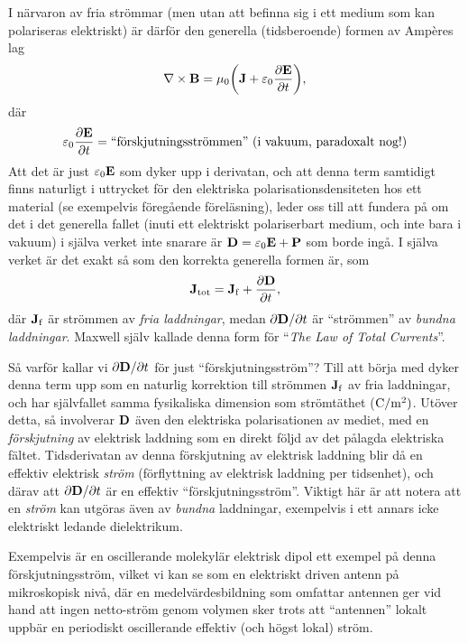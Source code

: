 I n{\"a}rvaron av fria str{\"o}mmar (men utan att befinna sig i ett medium som
kan polariseras elektriskt) {\"a}r d{\"a}rf{\"o}r den generella (tidsberoende)
formen av Amp\`eres lag
$$
  \nabla\times{\bf B}=\mu_0\bigg({\bf J}
    +\varepsilon_0{{\partial{\bf E}}\over{\partial t}}\bigg),
$$
d{\"a}r
$$
  \varepsilon_0{{\partial{\bf E}}\over{\partial t}}
    =\hbox{``f{\"o}rskjutningsstr{\"o}mmen'' (i vakuum, paradoxalt nog!)}
$$
Att det {\"a}r just $\varepsilon_0{\bf E}$ som dyker upp i derivatan, och att
denna term samtidigt finns naturligt i uttrycket f{\"o}r den elektriska
polarisationsdensiteten hos ett material (se exempelvis f{\"o}reg{\aa}ende
f{\"o}rel{\"a}sning), leder oss till att fundera p{\aa} om det i det generella
fallet (inuti ett elektriskt polariserbart medium, och inte bara i vakuum)
i sj{\"a}lva verket inte snarare {\"a}r ${\bf D}=\varepsilon_0{\bf E}+{\bf P}$
som borde ing{\aa}. I sj{\"a}lva verket {\"a}r det exakt s{\aa} som den
korrekta generella formen {\"a}r, som
$$
  {\bf J}_{\rm tot} = {\bf J}_{\rm f}+{{\partial{\bf D}}\over{\partial t}},
$$
d{\"a}r ${\bf J}_{\rm f}$ {\"a}r str{\"o}mmen av {\it fria laddningar}, medan
${{\partial{\bf D}}/{\partial t}}$ {\"a}r ``str{\"o}mmen'' av {\it bundna
laddningar}. Maxwell sj{\"a}lv kallade denna form f{\"o}r ``{\it The Law of
Total Currents}''.

S{\aa} varf{\"o}r kallar vi ${{\partial{\bf D}}/{\partial t}}$ f{\"o}r just
``f{\"o}rskjutningsstr{\"o}m''? Till att b{\"o}rja med dyker denna term upp
som en naturlig korrektion till str{\"o}mmen ${\bf J}_{\rm f}$ av fria
laddningar, och har sj{\"a}lvfallet samma fysikaliska dimension som
str{\"o}mt{\"a}thet (${\rm C}/{\rm m}^2)$. Ut{\"o}ver detta, s{\aa} involverar
${\bf D}$ {\"a}ven den elektriska polarisationen av mediet, med en
{\it f{\"o}rskjutning} av elektrisk laddning som en direkt f{\"o}ljd av det
p{\aa}lagda elektriska f{\"a}ltet. Tidsderivatan av denna f{\"o}rskjutning av
elektrisk laddning blir d{\aa} en effektiv elektrisk {\it str{\"o}m}
(f{\"o}rflyttning av elektrisk laddning per tidsenhet), och d{\"a}rav att
${{\partial{\bf D}}/{\partial t}}$ {\"a}r en effektiv
``f{\"o}rskjutningsstr{\"o}m''. Viktigt h{\"a}r {\"a}r att notera att en
{\it str{\"o}m} kan utg{\"o}ras {\"a}ven av {\it bundna} laddningar,
exempelvis i ett annars icke elektriskt ledande dielektrikum.
\smallskip
\centerline{}
\medskip
\noindent
Exempelvis {\"a}r en oscillerande molekyl{\"a}r elektrisk dipol ett exempel
p{\aa} denna f{\"o}rskjutningsstr{\"o}m, vilket vi kan se som en elektriskt
driven antenn p{\aa} mikroskopisk niv{\aa}, d{\"a}r en medelv{\"a}rdesbildning
som omfattar antennen ger vid hand att ingen netto-str{\"o}m genom volymen sker
trots att ``antennen'' lokalt uppb{\"a}r en periodiskt oscillerande effektiv
(och h{\"o}gst lokal) str{\"o}m.

